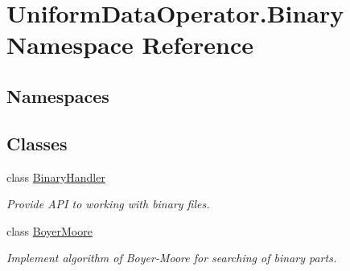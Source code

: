 \hypertarget{namespace_uniform_data_operator_1_1_binary}{}\section{Uniform\+Data\+Operator.\+Binary Namespace Reference}
\label{namespace_uniform_data_operator_1_1_binary}
\subsection*{Namespaces}
\begin{DoxyCompactItemize}
\end{DoxyCompactItemize}
\subsection*{Classes}
\begin{DoxyCompactItemize}
\item 
class \mbox{\hyperlink{class_uniform_data_operator_1_1_binary_1_1_binary_handler}{Binary\+Handler}}
\begin{DoxyCompactList}\small\item\em Provide A\+PI to working with binary files. \end{DoxyCompactList}\item 
class \mbox{\hyperlink{class_uniform_data_operator_1_1_binary_1_1_boyer_moore}{Boyer\+Moore}}
\begin{DoxyCompactList}\small\item\em Implement algorithm of Boyer-\/\+Moore for searching of binary parts. \end{DoxyCompactList}\end{DoxyCompactItemize}
